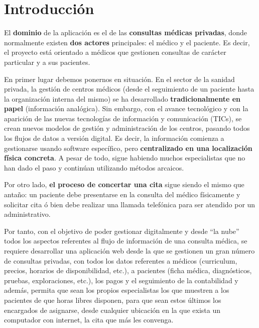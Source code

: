 \chapter*{Introducción} %
\label{cha:introduccion}
	El {\bf dominio} de la aplicación es el de las {\bf consultas médicas privadas}, donde normalmente existen {\bf dos actores} principales: el médico y el paciente. Es decir, el proyecto está orientado a médicos que gestionen consultas de carácter particular y a sus pacientes.

		En primer lugar debemos ponernos en situación. En el sector de la sanidad privada, la gestión de centros médicos (desde el seguimiento de un paciente hasta la organización interna del mismo) se ha desarrollado {\bf tradicionalmente en papel} (información analógica). Sin embargo, con el avance tecnológico y con la aparición de las nuevas tecnologías de información y comunicación (TICs), se crean nuevos modelos de gestión y administración de los centros, pasando todos los flujos de datos a versión digital. Es decir, la información comienza a gestionarse usando software específico, pero {\bf centralizado en una localización física concreta}. A pesar de todo, sigue habiendo muchos especialistas que no han dado el paso y continúan utilizando métodos arcaicos.

		Por otro lado, {\bf el proceso de concertar una cita} sigue siendo el mismo que antaño: un paciente debe presentarse en la consulta del médico físicamente y solicitar cita ó bien debe realizar una llamada telefónica para ser atendido por un administrativo.

		Por tanto, con el objetivo de poder gestionar digitalmente y desde “la nube” todos los aspectos referentes al flujo de información de una consulta médica, se requiere desarrollar una aplicación web desde la que se gestionen un gran número de consultas privadas, con todos los datos referentes a médicos (curriculum, precios, horarios de disponibilidad, etc.), a pacientes (ficha médica, diagnósticos, pruebas, exploraciones, etc.), los pagos y el seguimiento de la contabilidad y además, permita que sean los propios especialistas los que muestren a los pacientes de que horas libres disponen, para que sean estos últimos los encargados de asignarse, desde cualquier ubicación en la que exista un computador con internet, la cita que más les convenga.
